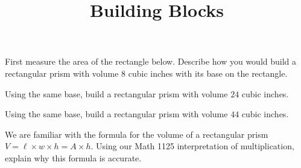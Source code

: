 \documentclass[nooutcomes,noauthor]{ximera}
\title{Building Blocks}
\begin{document}
\begin{abstract}
\end{abstract}
\maketitle




\begin{problem}
First measure the area of the rectangle below.  Describe how you would build a rectangular prism with volume $8$ cubic inches with its base on the rectangle.


\end{problem}

\begin{problem}
Using the same base, build a rectangular prism with volume $24$ cubic inches.

\end{problem}

\begin{problem}
Using the same base, build a rectangular prism with volume $44$ cubic inches.
\end{problem}


\begin{problem}
We are familiar with the formula for the volume of a rectangular prism $V = \ell \times w \times h = A \times h$.  Using our Math 1125 interpretation of multiplication, explain why this formula is accurate.

\end{problem}
\end{document}
